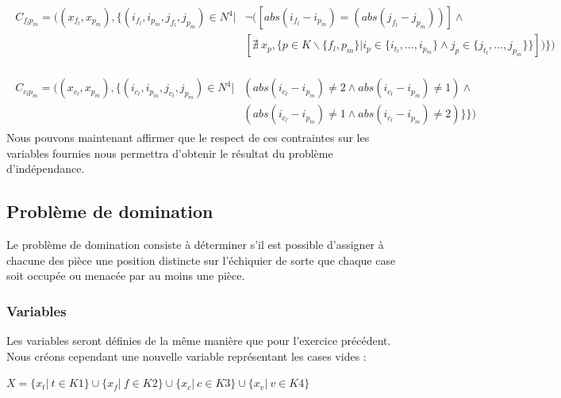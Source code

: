 \documentclass[a4paper]{article}
\begin{document}
\begin{align*}
\begin{split}
C_{f_lp_m} = ( (x_{f_l},x_{p_m}), \{ (i_{f_l},i_{p_m},j_{f_l},j_{p_m}) \in N^4 | & \neg( [ abs(i_{f_l} - i_{p_m}) = (abs(j_{f_l} - j_{p_m})) ]\wedge \\
& [ \nexists \ x_p, \{ p \in K \backslash \{f_l,p_m\} | i_{p} \in \{ i_{t_l},...,i_{p_m} \} \wedge j_p \in \{ j_{t_l},...,j_{p_m} \}\}  ] ) \} )
\end{split}
\end{align*}

\begin{align*}
\begin{split}
C_{c_lp_m} = ( (x_{c_l},x_{p_m}), \{ (i_{c_l},i_{p_m},j_{c_l},j_{p_m}) \in N^4 |& (abs(i_{c_l} - i_{p_m}) \neq 2 \wedge abs(i_{c_l} - i_{p_m}) \neq 1) \wedge \\
& (abs(i_{c_l} - i_{p_m}) \neq 1 \wedge abs(i_{c_l} - i_{p_m}) \neq 2)\} \} )
\end{split}
\end{align*}
Nous pouvons maintenant affirmer que le respect de ces contraintes sur les variables fournies nous permettra d'obtenir le résultat du problème d'indépendance. 

\subsection{Problème de domination}
Le problème de domination consiste à déterminer s’il est possible d’assigner à chacune des pièce une position distincte sur l'échiquier de sorte que chaque case soit occupée ou menacée par au moins une pièce.

\begin{center}
\end{center}

\subsubsection{Variables}
Les variables seront définies de la même manière que pour l'exercice précédent. Nous créons cependant une nouvelle variable représentant les cases vides : 
\begin{center}
$X = \{ x_t | \ t \in K1 \}  \cup \{ x_f | \ f \in K2 \} \cup \{ x_c | \ c \in K3 \} \cup \{ x_v | \ v \in K4 \}$
\end{center}
\end{document}
